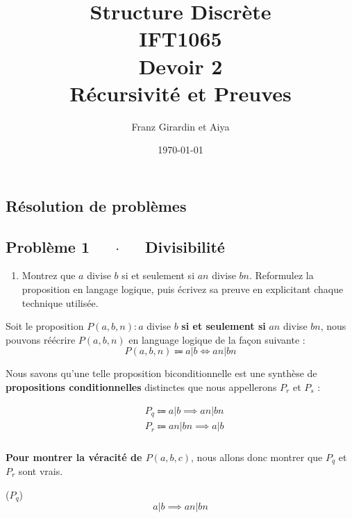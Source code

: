 \documentclass[16pt]{report}
\title{\Huge{Structure Discrète}\\{IFT1065}\\{\textbf{Devoir 2}} \\ {Récursivité et Preuves}}
\author{\huge{Franz Girardin et Aiya}}
\date{\today}
\begin{document}
\maketitle

\pagebreak
\begin{multicols*}{2}
\newcommand\scalemath[2]{\scalebox{#1}{\mbox{\ensuremath{\displaystyle #2}}}}

    \chapter{Résolution de problèmes}

    \section*{Problème 1 $\quad$ $\cdot$  $\quad$ Divisibilité}
    \begin{enumerate}
        \item Montrez que $a$ divise $b$ si et seulement si $an$ divise $bn$. Reformulez la proposition
        en langage logique, puis écrivez sa preuve en explicitant chaque technique utilisée.
    \end{enumerate}

    Soit le proposition $P(a, b, n) : a $ divise $b$ \textbf{si et seulement si} $an$ divise $bn$, 
    nous pouvons réécrire $P(a, b, n)$ en language logique de la façon suivante :
    \[ P(a,b,n) \Coloneqq a|b \Leftrightarrow  an|bn \]

    Nous savons qu'une telle proposition biconditionnelle est une synthèse de \textbf{propositions conditionnelles}
    distinctes que nous appellerons $P_r$ et $P_s$ :

    \begin{align}
              &P_q \Coloneqq a|b \implies  an|bn \\ 
              &P_r \Coloneqq an|bn \implies a|b
    \end{align}     
    \paragraph{}
    \textbf{Pour montrer la véracité de $P(a,b,c)$}, nous allons donc montrer que $P_q$ et $P_r$ sont vrais. 
    
    \begin{prop}{($P_q$)}{}
        \[ a|b \implies  an|bn \]
    \end{prop}
    

\end{multicols*}
\end{document}
